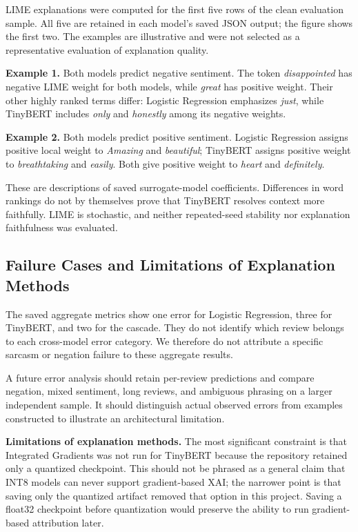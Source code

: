 \documentclass[10pt]{article}
\begin{document}
LIME explanations were computed for the first five rows of the clean evaluation
sample. All five are retained in each model's saved JSON output; the figure
shows the first two. The examples are illustrative and were not selected as a
representative evaluation of explanation quality.

\textbf{Example 1.} Both models predict negative sentiment. The token
\emph{disappointed} has negative LIME weight for both models, while
\emph{great} has positive weight. Their other highly ranked terms differ:
Logistic Regression emphasizes \emph{just}, while TinyBERT includes
\emph{only} and \emph{honestly} among its negative weights.

\textbf{Example 2.} Both models predict positive sentiment. Logistic Regression
assigns positive local weight to \emph{Amazing} and \emph{beautiful};
TinyBERT assigns positive weight to \emph{breathtaking} and \emph{easily}.
Both give positive weight to \emph{heart} and \emph{definitely}.

These are descriptions of saved surrogate-model coefficients. Differences in
word rankings do not by themselves prove that TinyBERT resolves context more
faithfully. LIME is stochastic, and neither repeated-seed stability nor
explanation faithfulness was evaluated.


\subsection{Failure Cases and Limitations of Explanation Methods}

The saved aggregate metrics show one error for Logistic Regression, three for
TinyBERT, and two for the cascade. They do not identify which review belongs to
each cross-model error category. We therefore do not attribute a specific
sarcasm or negation failure to these aggregate results.

A future error analysis should retain per-review predictions and compare
negation, mixed sentiment, long reviews, and ambiguous phrasing on a larger
independent sample. It should distinguish actual observed errors from examples
constructed to illustrate an architectural limitation.

\textbf{Limitations of explanation methods.}  The most significant constraint
is that Integrated Gradients was not run for TinyBERT because the repository
retained only a quantized checkpoint.  This should not be phrased as a general
claim that INT8 models can never support gradient-based XAI; the narrower point
is that saving only the quantized artifact removed that option in this project.
Saving a float32 checkpoint before quantization would preserve the ability to
run gradient-based attribution later.
\end{document}
